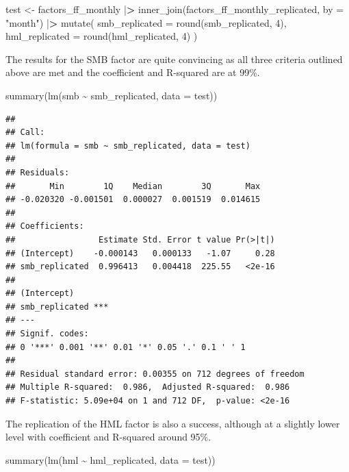\documentclass[
]{book}
\newenvironment{Shaded}{\begin{snugshade}}{\end{snugshade}}
\newcommand{\AttributeTok}[1]{\textcolor[rgb]{0.61,0.61,0.61}{#1}}
\newcommand{\DecValTok}[1]{\textcolor[rgb]{0.06,0.06,0.06}{#1}}
\newcommand{\ErrorTok}[1]{\textcolor[rgb]{0.14,0.14,0.14}{\textbf{#1}}}
\newcommand{\FunctionTok}[1]{\textcolor[rgb]{0,0,0}{#1}}
\newcommand{\NormalTok}[1]{#1}
\newcommand{\OtherTok}[1]{\textcolor[rgb]{0.37,0.37,0.37}{#1}}
\newcommand{\SpecialCharTok}[1]{\textcolor[rgb]{0,0,0}{#1}}
\newcommand{\StringTok}[1]{\textcolor[rgb]{0.5,0.5,0.5}{#1}}
\begin{document}
\begin{Shaded}
\begin{Highlighting}[]
\NormalTok{test }\OtherTok{\textless{}{-}}\NormalTok{ factors\_ff\_monthly }\SpecialCharTok{|}\ErrorTok{\textgreater{}}
  \FunctionTok{inner\_join}\NormalTok{(factors\_ff\_monthly\_replicated, }\AttributeTok{by =} \StringTok{"month"}\NormalTok{) }\SpecialCharTok{|}\ErrorTok{\textgreater{}}
  \FunctionTok{mutate}\NormalTok{(}
    \AttributeTok{smb\_replicated =} \FunctionTok{round}\NormalTok{(smb\_replicated, }\DecValTok{4}\NormalTok{),}
    \AttributeTok{hml\_replicated =} \FunctionTok{round}\NormalTok{(hml\_replicated, }\DecValTok{4}\NormalTok{)}
\NormalTok{  )}
\end{Highlighting}
\end{Shaded}

The results for the SMB factor are quite convincing as all three criteria outlined above are met and the coefficient and R-squared are at 99\%.

\begin{Shaded}
\begin{Highlighting}[]
\FunctionTok{summary}\NormalTok{(}\FunctionTok{lm}\NormalTok{(smb }\SpecialCharTok{\textasciitilde{}}\NormalTok{ smb\_replicated, }\AttributeTok{data =}\NormalTok{ test))}
\end{Highlighting}
\end{Shaded}

\begin{verbatim}
## 
## Call:
## lm(formula = smb ~ smb_replicated, data = test)
## 
## Residuals:
##       Min        1Q    Median        3Q       Max 
## -0.020320 -0.001501  0.000027  0.001519  0.014615 
## 
## Coefficients:
##                 Estimate Std. Error t value Pr(>|t|)
## (Intercept)    -0.000143   0.000133   -1.07     0.28
## smb_replicated  0.996413   0.004418  225.55   <2e-16
##                   
## (Intercept)       
## smb_replicated ***
## ---
## Signif. codes:  
## 0 '***' 0.001 '**' 0.01 '*' 0.05 '.' 0.1 ' ' 1
## 
## Residual standard error: 0.00355 on 712 degrees of freedom
## Multiple R-squared:  0.986,  Adjusted R-squared:  0.986 
## F-statistic: 5.09e+04 on 1 and 712 DF,  p-value: <2e-16
\end{verbatim}

The replication of the HML factor is also a success, although at a slightly lower level with coefficient and R-squared around 95\%.

\begin{Shaded}
\begin{Highlighting}[]
\FunctionTok{summary}\NormalTok{(}\FunctionTok{lm}\NormalTok{(hml }\SpecialCharTok{\textasciitilde{}}\NormalTok{ hml\_replicated, }\AttributeTok{data =}\NormalTok{ test))}
\end{Highlighting}
\end{Shaded}
\end{document}
